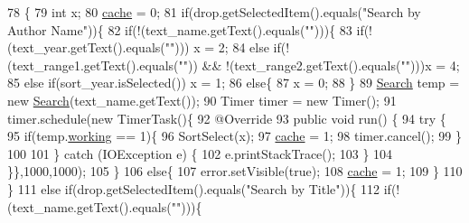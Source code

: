 \begin{DoxyCode}
78                                                                         \{
79         \textcolor{keywordtype}{int} x;
80         \hyperlink{classQuery1__GUI_aefa26438c30d278901bd04f6f83b57c0}{cache} = 0;
81         \textcolor{keywordflow}{if}(drop.getSelectedItem().equals(\textcolor{stringliteral}{"Search by Author Name"}))\{
82             \textcolor{keywordflow}{if}(!(text\_name.getText().equals(\textcolor{stringliteral}{""})))\{
83                 \textcolor{keywordflow}{if}(!(text\_year.getText().equals(\textcolor{stringliteral}{""}))) x = 2;
84                 \textcolor{keywordflow}{else} \textcolor{keywordflow}{if}(!(text\_range1.getText().equals(\textcolor{stringliteral}{""})) && !(text\_range2.getText().equals(\textcolor{stringliteral}{""})))x = 4;
85                 \textcolor{keywordflow}{else} \textcolor{keywordflow}{if}(sort\_year.isSelected()) x = 1;
86                 \textcolor{keywordflow}{else}\{
87                     x = 0;
88                 \}
89                 \hyperlink{classSearch}{Search} temp = \textcolor{keyword}{new} \hyperlink{classSearch}{Search}(text\_name.getText());
90                 Timer timer = \textcolor{keyword}{new} Timer();
91                 timer.schedule(\textcolor{keyword}{new} TimerTask()\{
92                     @Override
93                     \textcolor{keyword}{public} \textcolor{keywordtype}{void} run() \{
94                         \textcolor{keywordflow}{try} \{
95                             \textcolor{keywordflow}{if}(temp.\hyperlink{classSearch_a02e8edf97002a1cb7a0212339fd9f2df}{working} == 1)\{
96                                 SortSelect(x);
97                                 \hyperlink{classQuery1__GUI_aefa26438c30d278901bd04f6f83b57c0}{cache} = 1;
98                                 timer.cancel();
99                             \}
100                             
101                         \} \textcolor{keywordflow}{catch} (IOException e) \{
102                             e.printStackTrace();
103                         \}
104                 \}\},1000,1000);
105             \}
106             \textcolor{keywordflow}{else}\{
107                 error.setVisible(\textcolor{keyword}{true});
108                 \hyperlink{classQuery1__GUI_aefa26438c30d278901bd04f6f83b57c0}{cache} = 1;
109             \}
110         \}
111         \textcolor{keywordflow}{else} \textcolor{keywordflow}{if}(drop.getSelectedItem().equals(\textcolor{stringliteral}{"Search by Title"}))\{  
112             \textcolor{keywordflow}{if}(!(text\_name.getText().equals(\textcolor{stringliteral}{""})))\{

\end{DoxyCode}
